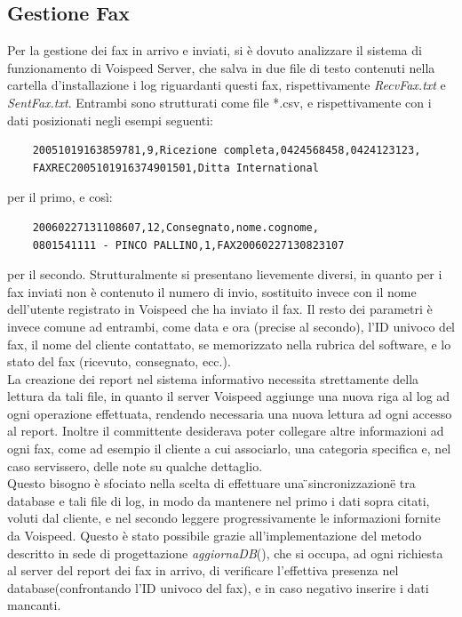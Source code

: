 \subsection{Gestione Fax}
Per la gestione dei fax in arrivo e inviati, si \`e dovuto analizzare il sistema di funzionamento di Voispeed Server, che salva in due file di testo contenuti nella cartella d'installazione i log riguardanti questi fax, rispettivamente \textit{RecvFax.txt} e \textit{SentFax.txt}. Entrambi sono strutturati come file *.csv, e rispettivamente con i dati posizionati negli esempi seguenti:
\begin{verbatim}
    20051019163859781,9,Ricezione completa,0424568458,0424123123,
    FAXREC2005101916374901501,Ditta International
\end{verbatim} 
per il primo, e cos\`i:
\begin{verbatim}
    20060227131108607,12,Consegnato,nome.cognome,
    0801541111 - PINCO PALLINO,1,FAX20060227130823107
\end{verbatim} 
\noindent per il secondo.
Strutturalmente si presentano lievemente diversi, in quanto per i fax inviati non \`e contenuto il numero di invio, sostituito invece con il nome dell'utente registrato in Voispeed che ha inviato il fax. Il resto dei parametri \`e invece comune ad entrambi, come data e ora (precise al secondo), l'ID univoco del fax, il nome del cliente contattato, se memorizzato nella rubrica del software, e lo stato del fax (ricevuto, consegnato, ecc.). \\
La creazione dei report nel sistema informativo necessita strettamente della lettura da tali file, in quanto il server Voispeed aggiunge una nuova riga al log ad ogni operazione effettuata, rendendo necessaria una nuova lettura ad ogni accesso al report. Inoltre il committente desiderava poter collegare altre informazioni ad ogni fax, come ad esempio il cliente a cui associarlo, una categoria specifica e, nel caso servissero, delle note su qualche dettaglio. \\
Questo bisogno \`e sfociato nella scelta di effettuare una \"{}sincronizzazione\"{} tra database e tali file di log, in modo da mantenere nel primo i dati sopra citati, voluti dal cliente, e nel secondo leggere progressivamente le informazioni fornite da Voispeed. Questo \`e stato possibile grazie all'implementazione del metodo descritto in sede di progettazione \textit{aggiornaDB}(), che si occupa, ad ogni richiesta al server del report dei fax in arrivo, di verificare l'effettiva presenza nel database(confrontando l'ID univoco del fax), e in caso negativo inserire i dati mancanti. 

